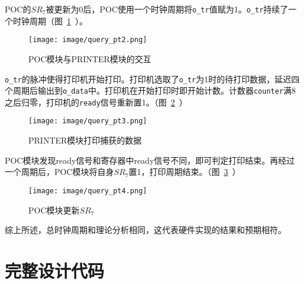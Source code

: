 \documentclass[lang=cn,a4paper,newtx]{elegantpaper}
\begin{document}
POC的$SR_7$被更新为0后，POC使用一个时钟周期将\texttt{o\_tr}值赋为1。\texttt{o\_tr}持续了一个时钟周期（图~\ref{fig:sim:poc}~）。
\begin{figure}[htbp]
    \centering
    \texttt{[image: image/query\_pt2.png]}
    \caption{POC模块与PRINTER模块的交互}
    \label{fig:sim:poc}
\end{figure}

\texttt{o\_tr}的脉冲使得打印机开始打印。打印机选取了\texttt{o\_tr}为1时的待打印数据，延迟四个周期后输出到\texttt{o\_data}中。打印机在开始打印时即开始计数。计数器\texttt{counter}满8之后归零，打印机的\texttt{ready}信号重新置1。（图~\ref{fig:sim:printer}~）

\begin{figure}[htbp]
    \centering
    \texttt{[image: image/query\_pt3.png]}
    \caption{PRINTER模块打印捕获的数据}
    \label{fig:sim:printer}
\end{figure}

POC模块发现ready信号和寄存器中ready信号不同，即可判定打印结束。再经过一个周期后，POC模块将自身$SR_7$置1，打印周期结束。（图~\ref{fig:sim:poc2}~）
\begin{figure}[htbp]
    \centering
    \texttt{[image: image/query\_pt4.png]}
    \caption{POC模块更新$SR_7$}
    \label{fig:sim:poc2}
\end{figure}

综上所述，总时钟周期和理论分析相同，这代表硬件实现的结果和预期相符。
\newpage
\appendix
\section{完整设计代码}
\end{document}
